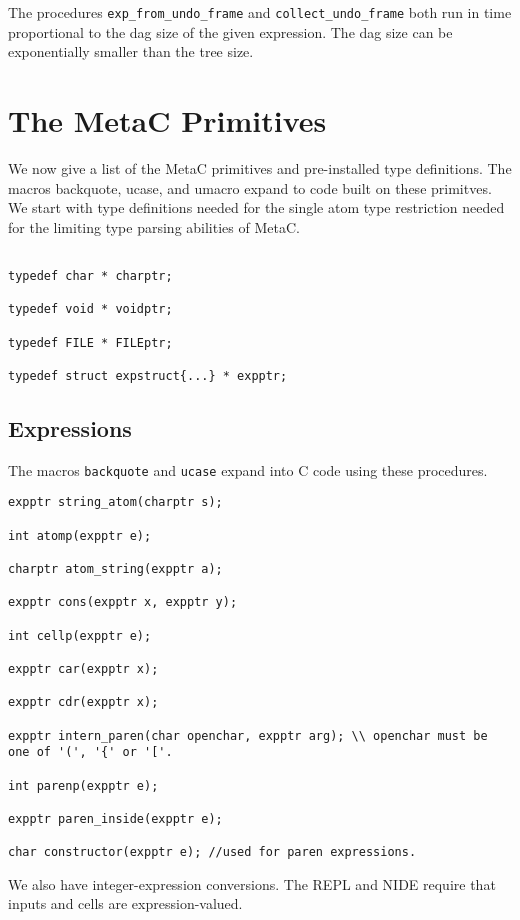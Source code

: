 \documentclass{article}
\begin{document}
The procedures {\tt exp\_from\_undo\_frame} and {\tt collect\_undo\_frame} both run in time proportional to the dag size of the
given expression. The dag size can be exponentially smaller than the tree size.

\section{The MetaC Primitives}

We now give a list of the MetaC primitives and pre-installed type definitions.  The macros backquote, ucase, and umacro expand to code built on these primitves.
We start with type definitions needed for the single atom type restriction needed for the limiting type parsing abilities of MetaC.

\begin{verbatim}

typedef char * charptr;

typedef void * voidptr;

typedef FILE * FILEptr;

typedef struct expstruct{...} * expptr;
\end{verbatim}

\subsection{Expressions}

The macros {\tt backquote} and {\tt ucase} expand into C code using these procedures.

\begin{verbatim}
expptr string_atom(charptr s);

int atomp(expptr e);

charptr atom_string(expptr a);

expptr cons(expptr x, expptr y);

int cellp(expptr e);

expptr car(expptr x);

expptr cdr(expptr x);

expptr intern_paren(char openchar, expptr arg); \\ openchar must be one of '(', '{' or '['.

int parenp(expptr e);

expptr paren_inside(expptr e);

char constructor(expptr e); //used for paren expressions.
\end{verbatim}

We also have integer-expression conversions.  The REPL and NIDE require that inputs and cells are expression-valued.
\end{document}
